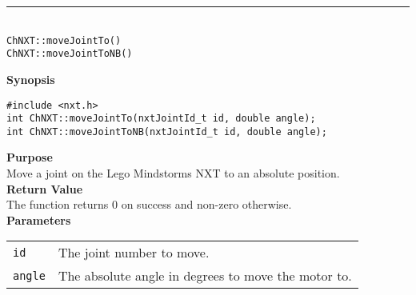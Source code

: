 \noindent
\vspace{5pt}
\rule{4.5in}{0.015in}\\
\noindent
{\LARGE \texttt{ChNXT::moveJointTo()} }\\
{\LARGE \texttt{ChNXT::moveJointToNB()} }\\


\noindent
{\bf Synopsis}
\vspace{-8pt}
\begin{verbatim}
#include <nxt.h>
int ChNXT::moveJointTo(nxtJointId_t id, double angle);
int ChNXT::moveJointToNB(nxtJointId_t id, double angle);
\end{verbatim}

\noindent
{\bf Purpose}\\
Move a joint on the Lego Mindstorms NXT to an absolute position.\\

\noindent
{\bf Return Value}\\
The function returns 0 on success and non-zero otherwise.\\

\noindent
{\bf Parameters}\\
\vspace{-0.1in}
\begin{description}
\item               
\begin{tabular}{p{10 mm}p{145 mm}}
\texttt{id} & The joint number to move. \\
\texttt{angle}&The absolute angle in degrees to move the motor to.\\
\end{tabular}
\end{description}

